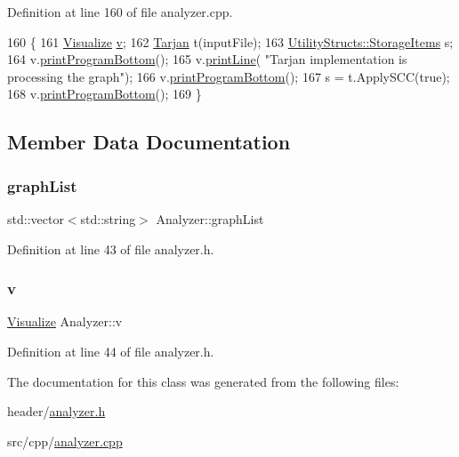 Definition at line 160 of file analyzer.\+cpp.


\begin{DoxyCode}
160                                                     \{
161     \hyperlink{class_visualize}{Visualize} \hyperlink{class_analyzer_ae32079d0816589617a0c76b1d4cf881b}{v};
162     \hyperlink{class_tarjan}{Tarjan} t(inputFile);
163     \hyperlink{struct_utility_structs_1_1_storage_items}{UtilityStructs::StorageItems} s;
164     v.\hyperlink{class_visualize_ac0be9ece2d80a7d1e34724fb87424216}{printProgramBottom}();
165     v.\hyperlink{class_visualize_abce6cd538dc0715b21851e0bf0377d85}{printLine}( \textcolor{stringliteral}{"Tarjan implementation is processing the graph"});
166     v.\hyperlink{class_visualize_ac0be9ece2d80a7d1e34724fb87424216}{printProgramBottom}();
167     s = t.ApplySCC(\textcolor{keyword}{true});
168     v.\hyperlink{class_visualize_ac0be9ece2d80a7d1e34724fb87424216}{printProgramBottom}();
169 \}
\end{DoxyCode}


\subsection{Member Data Documentation}
\mbox{\label{class_analyzer_a567b5d8b2bbdde28b489834c1644446e}} 
\subsubsection{\texorpdfstring{graph\+List}{graphList}}
{\footnotesize\ttfamily std\+::vector$<$std\+::string$>$ Analyzer\+::graph\+List}



Definition at line 43 of file analyzer.\+h.

\mbox{\label{class_analyzer_ae32079d0816589617a0c76b1d4cf881b}} 
\subsubsection{\texorpdfstring{v}{v}}
{\footnotesize\ttfamily \hyperlink{class_visualize}{Visualize} Analyzer\+::v}



Definition at line 44 of file analyzer.\+h.



The documentation for this class was generated from the following files\+:\begin{DoxyCompactItemize}
\item 
header/\hyperlink{analyzer_8h}{analyzer.\+h}\item 
src/cpp/\hyperlink{analyzer_8cpp}{analyzer.\+cpp}\end{DoxyCompactItemize}
